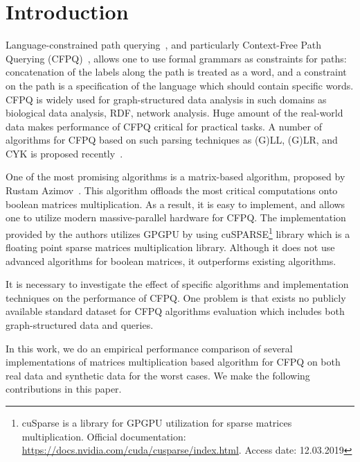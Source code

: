 \section{Introduction}

Language-constrained path querying~\cite{FLCpathProblem}, and particularly Context-Free Path Querying (CFPQ)~\cite{Yannakakis}, allows one to use formal grammars as constraints for paths: concatenation of the labels along the path is treated as a word, and a constraint on the path is a specification of the language which should contain specific words.
CFPQ is widely used for graph-structured data analysis in such domains as biological data analysis, RDF, network analysis.
Huge amount of the real-world data makes performance of CFPQ critical for practical tasks.
A number of algorithms for CFPQ based on such parsing techniques as (G)LL, (G)LR, and CYK is proposed recently~\cite{hellingsPathQuerying,Grigorev:2017:CPQ:3166094.3166104,Verbitskaia:2018:PCC:3241653.3241655,RDF,10.1007/978-3-319-91662-0_17,Medeiros:2018:EEC:3167132.3167265}.

One of the most promising algorithms is a matrix-based algorithm, proposed by Rustam Azimov~\cite{Azimov:2018:CPQ:3210259.3210264}.
This algorithm offloads the most critical computations onto boolean matrices multiplication.
As a result, it is easy to implement, and allows one to utilize modern massive-parallel hardware for CFPQ.
The implementation provided by the authors utilizes GPGPU by using cuSPARSE\footnote{cuSparse is a library for GPGPU utilization for sparse matrices multiplication. Official documentation: \url{https://docs.nvidia.com/cuda/cusparse/index.html}. Access date: 12.03.2019} library which is a floating point sparse matrices multiplication library.
Although it does not use advanced algorithms for boolean matrices, it outperforms existing algorithms.

It is necessary to investigate the effect of specific algorithms and implementation techniques on the performance of CFPQ.
One problem is that exists no publicly available standard dataset for CFPQ algorithms evaluation which includes both graph-structured data and queries.

In this work, we do an empirical performance comparison of several implementations of matrices multiplication based algorithm for CFPQ on both real data and synthetic data for the worst cases.
We make the following contributions in this paper.

